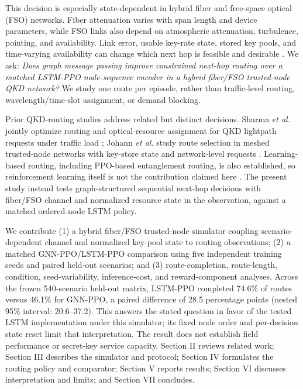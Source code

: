 \documentclass[journal]{IEEEtran}
\begin{document}
This decision is especially state-dependent in hybrid fiber and free-space optical (FSO) networks. Fiber attenuation varies with span length and device parameters, while FSO links also depend on atmospheric attenuation, turbulence, pointing, and availability. Link error, usable key-rate state, stored key pools, and time-varying availability can change which next hop is feasible and desirable \cite{mehic2020,johann2024}. We ask: \emph{Does graph message passing improve constrained next-hop routing over a matched LSTM-PPO node-sequence encoder in a hybrid fiber/FSO trusted-node QKD network?} We study one route per episode, rather than traffic-level routing, wavelength/time-slot assignment, or demand blocking.

Prior QKD-routing studies address related but distinct decisions. Sharma \emph{et al.} jointly optimize routing and optical-resource assignment for QKD lightpath requests under traffic load \cite{sharma2023}; Johann \emph{et al.} study route selection in meshed trusted-node networks with key-store state and network-level requests \cite{johann2024}. Learning-based routing, including PPO-based entanglement routing, is also established, so reinforcement learning itself is not the contribution claimed here \cite{roik2024routing,amer2023dynamic}. The present study instead tests graph-structured sequential next-hop decisions with fiber/FSO channel and normalized resource state in the observation, against a matched ordered-node LSTM policy.

We contribute (1) a hybrid fiber/FSO trusted-node simulator coupling scenario-dependent channel and normalized key-pool state to routing observations; (2) a matched GNN-PPO/LSTM-PPO comparison using five independent training seeds and paired held-out scenarios; and (3) route-completion, route-length, condition, seed-variability, inference-cost, and reward-component analyses. Across the frozen 540-scenario held-out matrix, LSTM-PPO completed 74.6\% of routes versus 46.1\% for GNN-PPO, a paired difference of 28.5 percentage points (nested 95\% interval: 20.6--37.2). This answers the stated question in favor of the tested LSTM implementation under this simulator; its fixed node order and per-decision state reset limit that interpretation. The result does not establish field performance or secret-key service capacity. Section II reviews related work; Section III describes the simulator and protocol; Section IV formulates the routing policy and comparator; Section V reports results; Section VI discusses interpretation and limits; and Section VII concludes.
\end{document}

